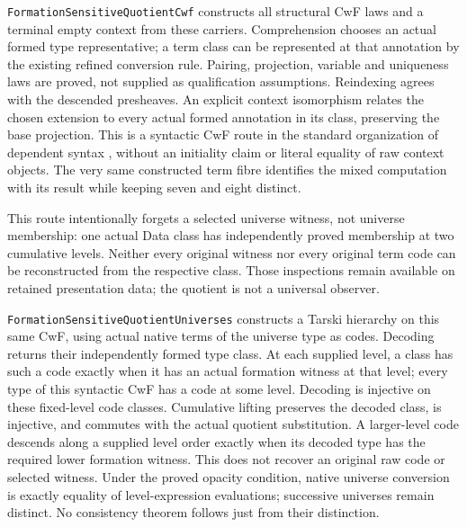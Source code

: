 \documentclass[11pt]{article}
\theoremstyle{definition}
\theoremstyle{remark}
\begin{document}
\nolinkurl{FormationSensitiveQuotientCwf} constructs all structural CwF
laws and a terminal empty context from these carriers. Comprehension
chooses an actual formed type representative; a term class can be represented
at that annotation by the existing refined conversion rule. Pairing,
projection, variable and uniqueness laws are proved, not supplied as
qualification assumptions. Reindexing agrees with the descended presheaves.
An explicit context isomorphism relates the chosen extension to every
actual formed annotation in its class, preserving the base projection.
This is a syntactic CwF route in the standard organization of dependent
syntax \cite{CastellanClairambaultDybjerCwfs}, without an initiality claim or
literal equality of raw context objects. The very same constructed term
fibre identifies the mixed computation with its result while keeping seven
and eight distinct.

This route intentionally forgets a selected universe witness, not universe
membership: one actual Data class has independently proved membership at
two cumulative levels. Neither every original witness nor every original
term code can be reconstructed from the respective class. Those inspections
remain available on retained presentation data; the quotient is not a
universal observer.

\nolinkurl{FormationSensitiveQuotientUniverses} constructs a Tarski hierarchy
on this same CwF, using actual native terms of the universe type as codes.
Decoding returns their independently formed type class. At each supplied
level, a class has such a code exactly when it has an actual formation
witness at that level; every type of this syntactic CwF has a code at some
level. Decoding is injective on these fixed-level code classes. Cumulative
lifting preserves the decoded class, is injective, and commutes with the
actual quotient substitution. A larger-level code descends along a supplied
level order exactly when its decoded type has the required lower formation
witness. This does not recover an original raw code or selected witness.
Under the proved opacity condition, native universe conversion is exactly
equality of level-expression evaluations; successive universes remain
distinct. No consistency theorem follows just from their distinction.
\end{document}

